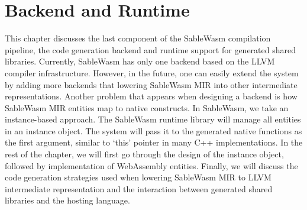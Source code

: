 \chapter{Backend and Runtime}

This chapter discusses the last component of the SableWasm compilation pipeline, the code generation backend and runtime support for generated shared libraries. Currently, SableWasm has only one backend based on the LLVM compiler infrastructure. However, in the future, one can easily extend the system by adding more backends that lowering SableWasm MIR into other intermediate representations. Another problem that appears when designing a backend is how SableWasm MIR entities map to native constructs. In SableWasm, we take an instance-based approach. The SableWasm runtime library will manage all entities in an instance object. The system will pass it to the generated native functions as the first argument, similar to `this' pointer in many C++ implementations. In the rest of the chapter, we will first go through the design of the instance object, followed by implementation of WebAssembly entities. Finally, we will discuss the code generation strategies used when lowering SableWasm MIR to LLVM intermediate representation and the interaction between generated shared libraries and the hosting language.





